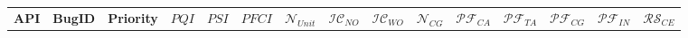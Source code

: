 \begin{table*}[t]
\setlength{\tabcolsep}{3pt}
\centering
\scriptsize
\begin{tabular}{l|l|l|l|l|c|c|c|c|c|c|c|c|c|c}
\multicolumn{1}{c|}{\textbf{API}} &
\multicolumn{1}{c|}{\textbf{BugID}} &
\multicolumn{1}{c|}{\textbf{Priority}} &
\multicolumn{1}{c|}{\textbf{$PQI$}} &
\multicolumn{1}{c|}{\textbf{$PSI$}} &
\multicolumn{1}{c|}{\textbf{$PFCI$}} &
\multicolumn{1}{c|}{\textbf{$\mathcal{N}_{Unit}$}} &
\multicolumn{1}{c|}{\textbf{$\mathcal{IC}_{NO}$}} & %
\multicolumn{1}{c|}{\textbf{$\mathcal{IC}_{WO}$}} & %
\multicolumn{1}{c|}{\textbf{$\mathcal{N}_{CG}$}} &
\multicolumn{1}{c|}{\textbf{$\mathcal{PF}_{CA}$}} & %
\multicolumn{1}{c|}{\textbf{$\mathcal{PF}_{TA}$}} & %
\multicolumn{1}{c|}{\textbf{$\mathcal{PF}_{CG}$}} & %
\multicolumn{1}{c|}{\textbf{$\mathcal{PF}_{IN}$}} & %
\multicolumn{1}{c}{\textbf{$\mathcal{RS}_{CE}$}}\\ %


\end{tabular}
\end{table*}
